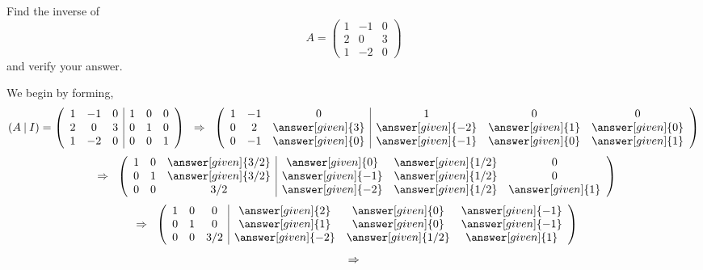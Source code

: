 \documentclass{ximera}
\begin{document}
 \begin{example}
Find the inverse of
 \[A= \left(\begin{array}{ccc}
  1 &  -1 & 0 \\
  2 &  0 & 3 \\
  1 & -2 & 0
\end{array}\right)
\]
and verify your answer.

\begin{prompt}
We begin by forming,
\[
(A \hspace{.08cm}|\hspace{.08cm} I)= \left(\begin{array}{ccc|ccc}
  1 &  -1 & 0 & 1 &0 &0 \\
  2 &  0 & 3 & 0 &1 &0\\
  1 & -2 & 0 & 0 &0 &1
\end{array}\right)
\hspace{.2cm}\Rightarrow \hspace{.2cm}
\left(\begin{array}{ccc|ccc}
  1 &  -1 & 0 & 1 &0 &0 \\
  0 &  2 & \answer[given]{3} & \answer[given]{-2} &\answer[given]{1} &\answer[given]{0}\\
  0 & -1 & \answer[given]{0} & \answer[given]{-1} &\answer[given]{0} &\answer[given]{1}
\end{array}\right)\]
\[\hspace{.2cm}\Rightarrow \hspace{.2cm}
\left(\begin{array}{ccc|ccc}
  1 &  0 & \answer[given]{3/2} & \answer[given]{0} &\answer[given]{1/2} &0 \\
  0 &  1 & \answer[given]{3/2} & \answer[given]{-1} &\answer[given]{1/2} &0\\
  0 & 0 & 3/2 & \answer[given]{-2} &\answer[given]{1/2} &\answer[given]{1}
\end{array}\right)
\]
\[
\hspace{.2cm}\Rightarrow \hspace{.2cm}
\left(\begin{array}{ccc|ccc}
  1 &  0 & 0 & \answer[given]{2}  &\answer[given]{0}  &\answer[given]{-1}  \\
  0 &  1 &0& \answer[given]{1}  & \answer[given]{0} &\answer[given]{-1} \\
  0 & 0 & 3/2&\answer[given]{-2}   &\answer[given]{1/2}  &\answer[given]{1}
\end{array}\right)
\]
\[\hspace{.2cm}\Rightarrow \hspace{.2cm}
\]
\end{prompt}
\end{example}
\end{document}
